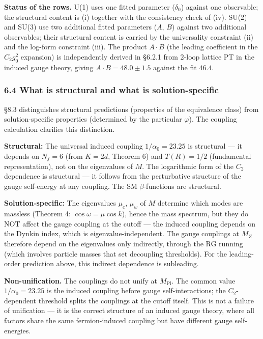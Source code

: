 \documentclass[
]{article}
\begin{document}
\textbf{Status of the rows.} U(1) uses one fitted parameter
(\(\delta_0\)) against one observable; the structural content is (i)
together with the consistency check of (iv). SU(2) and SU(3) use two
additional fitted parameters (\(A\), \(B\)) against two additional
observables; their structural content is carried by the universality
constraint (ii) and the log-form constraint (iii). The product
\(A \cdot B\) (the leading coefficient in the \(C_2 g_0^2\) expansion)
is independently derived in §6.2.1 from 2-loop lattice PT in the induced
gauge theory, giving \(A \cdot B = 48.0 \pm 1.5\) against the fit
\(46.4\).

\hypertarget{what-is-structural-and-what-is-solution-specific}{%
\subsubsection{6.4 What is structural and what is
solution-specific}\label{what-is-structural-and-what-is-solution-specific}}

§8.3 distinguishes structural predictions (properties of the equivalence
class) from solution-specific properties (determined by the particular
\(\varphi\)). The coupling calculation clarifies this distinction.

\textbf{Structural:} The universal induced coupling
\(1/\alpha_0 = 23.25\) is structural --- it depends on \(N_f = 6\) (from
\(K = 2d\), Theorem 6) and \(T(R) = 1/2\) (fundamental representation),
not on the eigenvalues of \(M\). The logarithmic form of the \(C_2\)
dependence is structural --- it follows from the perturbative structure
of the gauge self-energy at any coupling. The SM \(\beta\)-functions are
structural.

\textbf{Solution-specific:} The eigenvalues \(\mu_c\), \(\mu_w\) of
\(M\) determine which modes are massless (Theorem 4:
\(\cos\omega = \mu \cos k\)), hence the mass spectrum, but they do NOT
affect the gauge coupling at the cutoff --- the induced coupling depends
on the Dynkin index, which is eigenvalue-independent. The gauge
couplings at \(M_Z\) therefore depend on the eigenvalues only
indirectly, through the RG running (which involves particle masses that
set decoupling thresholds). For the leading-order prediction above, this
indirect dependence is subleading.

\textbf{Non-unification.} The couplings do not unify at
\(M_{\text{Pl}}\). The common value \(1/\alpha_0 = 23.25\) is the
induced coupling before gauge self-interactions; the \(C_2\)-dependent
threshold splits the couplings at the cutoff itself. This is not a
failure of unification --- it is the correct structure of an induced
gauge theory, where all factors share the same fermion-induced coupling
but have different gauge self-energies.
\end{document}
